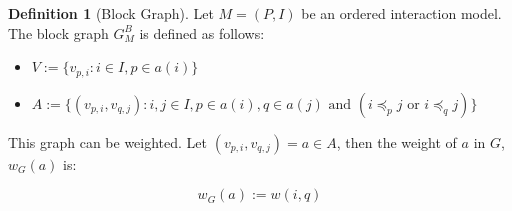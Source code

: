 \documentclass[a4paper,11pt]{book}
\theoremstyle{definition}
\newtheorem{definition}{Definition}
\begin{document}
\begin{definition}[Block Graph]
    Let $M = (P, I)$ be an ordered interaction model. The block graph $G^B_{M}$ is defined as follows:

    \begin{itemize}
        \item $V := \{ v_{p, i} : i \in I, p \in a(i) \}$\\
        \item $A := \{ (v_{p,i}, v_{q,j}) : i, j \in I, p \in a(i), q \in a(j) \mbox{ and } (i \preceq_p j \mbox{ or } i \preceq_q j) \}$\\
    \end{itemize}

    This graph can be weighted. Let $(v_{p,i}, v_{q, j}) = a \in A$, then the weight of $a$ in $G$, $w_G(a)$ is:

    \begin{equation*}
        w_G(a) := w(i, q)
    \end{equation*}
\end{definition}
\end{document}
